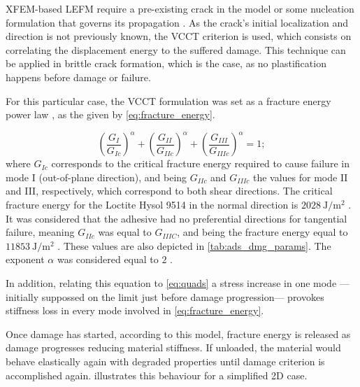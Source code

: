 \documentclass[
documentsize = a4, %
font = cmr, %
typesize = 11, %
printmode = true,
onehalfspacing = true,
language = en, %
titlepage = udciccp, %
degree = pt, %
dedication = true,
acknowledgements = true,
abstract-en = true,
abstract-es = false,
abstract-ga = false,
epigraphs = true,
toc = true,
lof = true,
lot = true,
frontmatterintoc = false,
notation = false,
minimal = false,
]{UDCthesis}
\begin{document}
\Gls{XFEM}-based \gls{LEFM} require a pre-existing crack in the model or some nucleation formulation that governs its propagation \citep{Abaqus613Manual}. As the crack's initial localization and direction is not previously known, the \gls{VCCT} criterion is used, which consists on correlating the displacement energy to the suffered damage. This technique can be applied in brittle crack formation, which is the case, as no plastification happens before damage or failure.

For this particular case, the \gls{VCCT} formulation was set as a fracture energy power law \citep{Loureiro2010, Sadowski2010, Sadowski2011, Sadowski2014, SernaMoreno2015}, as the given by \cref{eq:fracture_energy}.

\begin{equation}
\left(\frac{G_{I}}{G_{Ic}}\right)^{\alpha}+\left(\frac{G_{II}}{G_{IIc}}\right)^{\alpha}+\left(\frac{G_{III}}{G_{IIIc}}\right)^{\alpha}=1 ;
\label{eq:fracture_energy}
\end{equation}
where $G_{Ic}$ corresponds to the critical fracture energy required to cause failure in mode I (out-of-plane direction), and being $G_{IIc}$ and $G_{IIIc}$ the values for mode II and III, respectively, which correspond to both shear directions. The critical fracture energy for the Loctite Hysol 9514 in the normal direction is $\SI{2028}{\J/\m^2}$ \citep{Scattina2011}. It was considered that the adhesive had no preferential directions for tangential failure, meaning $G_{IIc}$ was equal to $G_{IIIC}$, and being the fracture energy equal to $\SI{11853}{\J/\m^2}$ \citep{Scattina2011}. These values are also depicted in \cref{tab:ads_dmg_params}. The exponent $\alpha$ was considered equal to $\num{2}$ \citep{Loureiro2010, Sadowski2010, Sadowski2011, Sadowski2014, SernaMoreno2015}.

In addition, relating this equation to \cref{eq:quads} a stress increase in one mode ---initially suppossed on the limit just before damage progression--- provokes stiffness loss in every mode involved in \cref{eq:fracture_energy}.

Once damage has started, according to this model, fracture energy is released as damage progresses reducing material stiffness. If unloaded, the material would behave elastically again with degraded properties until damage criterion is accomplished again.  illustrates this behaviour for a simplified 2D case.
\end{document}
